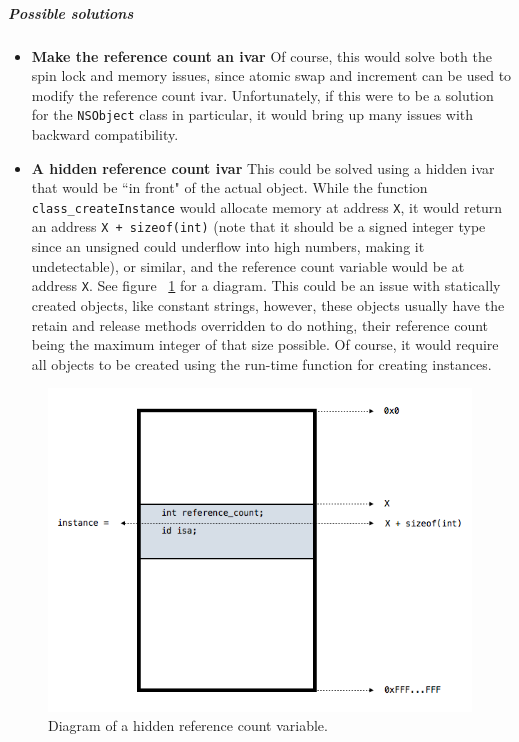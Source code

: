 \subparagraph{Possible solutions}
\begin{itemize}
  \item{\bf{Make the reference count an ivar}} Of course, this would solve both the spin lock and memory issues, since atomic swap and increment can be used to modify the reference count ivar. Unfortunately, if this were to be a solution for the \verb=NSObject= class in particular, it would bring up many issues with backward compatibility.
  \item{\bf{A hidden reference count ivar}} This could be solved using a hidden ivar that would be ``in front" of the actual object. While the function \verb=class_createInstance= would allocate memory at address \verb=X=, it would return an address \verb=X + sizeof(int)= (note that it should be a signed integer type since an unsigned could underflow into high numbers, making it undetectable), or similar, and the reference count variable would be at address \verb=X=. See figure ~\ref{fig:ref_cnt_hidden_ivar} for a diagram. This could be an issue with statically created objects, like constant strings, however, these objects usually have the retain and release methods overridden to do nothing, their reference count being the maximum integer of that size possible. Of course, it would require all objects to be created using the run-time function for creating instances.
\end{itemize}

\begin{figure}[H]
  \includegraphics[width=\textwidth]{img/hidden_ref_cnt_var.png}
  
  \centering{}
  \caption{Diagram of a hidden reference count variable.}
  \label{fig:ref_cnt_hidden_ivar}
\end{figure}

